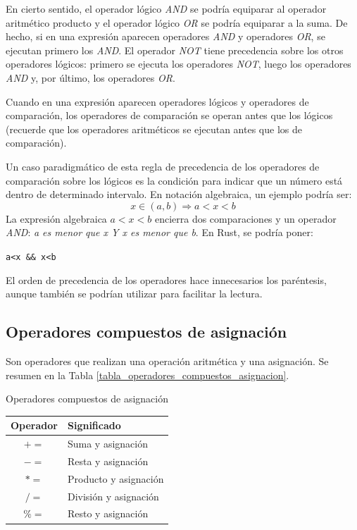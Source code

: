 En cierto sentido, el operador lógico \textit{AND} se podría equiparar al operador aritmético producto y el operador lógico \textit{OR} se podría equiparar a la suma. De hecho, si en una expresión aparecen operadores \textit{AND} y operadores \textit{OR}, se ejecutan primero los \textit{AND}. El operador \textit{NOT} tiene precedencia sobre los otros operadores lógicos: primero se ejecuta los operadores \textit{NOT}, luego los operadores \textit{AND} y, por último, los operadores \textit{OR}.
 
Cuando en una expresión aparecen operadores lógicos y operadores de comparación, los operadores de comparación se operan antes que los lógicos (recuerde que los operadores aritméticos se ejecutan antes que los de comparación). 

Un caso paradigmático de esta regla de precedencia de los operadores de comparación sobre los lógicos es la condición para indicar que un número está dentro de determinado intervalo. En notación algebraica, un ejemplo podría ser:
\[x \in (a, b) \Rightarrow a < x < b\]
La expresión algebraica $a<x<b$ encierra dos comparaciones y un operador \textit{AND}: \textit{a es menor que x Y x es menor que b}. En Rust, se podría poner:

{\centering \texttt{a<x \&\& x<b} \par}

El orden de precedencia de los operadores hace innecesarios los paréntesis, aunque también se podrían utilizar para facilitar la lectura.

\subsection{Operadores compuestos de asignación}
\noindent Son operadores que realizan una operación aritmética y una asignación. Se resumen en la Tabla \ref{tabla_operadores_compuestos_asignacion}.

\begin{center}
   \begin{mytable}[label=tabla_operadores_compuestos_asignacion]{\centering\footnotesize Operadores compuestos de asignación}
      \footnotesize
      \begin{tabular}{c l}
         \hline
         \textbf{Operador} & \textbf{Significado} \\ \hline
         $+=$ & Suma y asignación \\
         $-=$ & Resta y asignación \\
         $*=$ & Producto y asignación\\
         $/=$ & División y asignación\\
         $\%=$ & Resto y asignación\\
      \end{tabular}
   \end{mytable}
\end{center}

